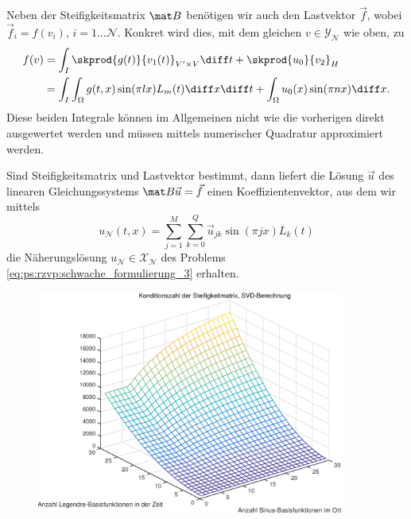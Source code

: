 Neben der Steifigkeitsmatrix $\mat B$ benötigen wir auch den Lastvektor $\vec f$, wobei $\vec f_{i} = f(v_{i})$, $i = 1 \dots \mathcal N$.
Konkret wird dies, mit dem gleichen $v \in \mathcal Y_{\mathcal N}$ wie oben, zu
\begin{align}
    f(v)
    &= \int_{I} \skprod{g(t)}{v_{1}(t)}_{V' \times V} \diff t + \skprod{u_{0}}{v_{2}}_{H}
    \\&= \int_{I} \int_{\Omega} g(t, x) \sin(\pi l x) L_{m}(t) \diff x \diff t + \int_{\Omega} u_{0}(x) \sin(\pi n x) \diff x.
\end{align}
Diese beiden Integrale können im Allgemeinen nicht wie die vorherigen direkt ausgewertet werden und müssen mittels numerischer Quadratur approximiert werden.

Sind Steifigkeitsmatrix und Lastvektor bestimmt, dann liefert die Lösung $\vec u$ des linearen Gleichungssystems $\mat B \vec u = \vec f$ einen Koeffizientenvektor, aus dem wir mittels
\begin{equation}
    u_{\mathcal N}(t, x) = \sum_{j = 1}^{M} \sum_{k = 0}^{Q} \vec u_{jk} \sin(\pi j x) L_{k}(t)
\end{equation}
die Näherungslösung $u_{\mathcal N} \in \mathcal X_{\mathcal N}$ des Problems \cref{eq:ps:rzvp:schwache_formulierung_3} erhalten.



\clearpage
\begin{figure}[tb]
    \begin{center}
        \includegraphics[width=0.9\textwidth]{figures/oned/conds.pdf}
    \end{center}
\end{figure}

